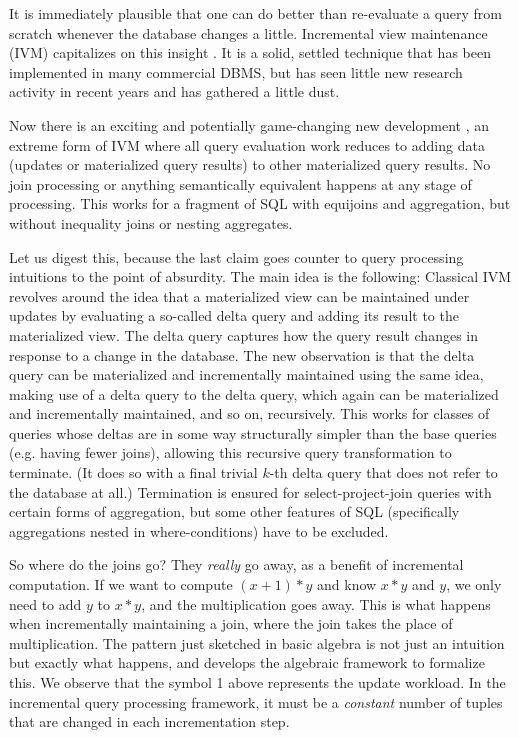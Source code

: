 
It is immediately plausible that one can do better than re-evaluate a query from scratch whenever the database changes a little. Incremental view maintenance (IVM) capitalizes on this insight \cite{DBLP:journals/tods/BunemanC79,DBLP:conf/sigmod/ShmueliI84,DBLP:conf/sigmod/BlakeleyLT86,roussopoulos-tods:91,DBLP:conf/vldb/CeriW91,DBLP:conf/deductive/GuptaKM92,DBLP:conf/sigmod/GuptaMS93,griffin-sigmod:95,yan-vldb:95,colby-sigmod:96,GHJ1996,kotidis-tods:01}. It is a solid, settled technique that has been implemented in many commercial DBMS, but has seen little new research activity in recent years and has gathered a little dust.

Now there is an exciting and potentially game-changing new development \cite{ahmad-vldb:09, koch-pods:10, kennedy-ahmad-koch-cidr:11}, an extreme form of IVM where all query evaluation work reduces to adding data (updates or materialized query results) to other materialized query results.  No join processing or anything semantically equivalent happens at any stage of processing. This works for a fragment of SQL with equijoins and aggregation, but without inequality joins or nesting aggregates.


Let us digest this, because the last claim goes counter to query processing intuitions to the point of absurdity. The main idea is the following: Classical IVM revolves around the idea that a materialized view can be maintained under updates by evaluating a so-called delta query and adding its result to the materialized view. The delta query captures how the query result changes in response to a change in the database. The new observation is that the delta query can be materialized and incrementally maintained using the same idea, making use of a delta query to the delta query, which again can be materialized and incrementally maintained, and so on, recursively. This works for classes of queries whose deltas are in some way structurally simpler than the base queries (e.g. having fewer joins), allowing this recursive query transformation to terminate. (It does so with a final trivial $k$-th delta query that does not refer to the database at all.) Termination is ensured for select-project-join queries with certain forms of aggregation, but some other features of SQL (specifically aggregations nested in where-conditions) have to be excluded. 

So where do the joins go? They {\em really} go away, as a benefit of incremental computation. If we want to compute $(x+1)*y$ and know $x*y$ and $y$, we only need to add $y$ to $x*y$, and the multiplication goes away. This is what happens when incrementally maintaining a join, where the join takes the place of multiplication. The pattern just sketched in basic algebra is not just an intuition but exactly what happens, and \cite{koch-pods:10} develops the algebraic framework to formalize this. We observe that the symbol 1 above represents the update workload.  In the incremental query processing framework, it must be a {\em constant} number of tuples that are changed in each incrementation step.

